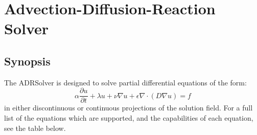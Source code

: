 \chapter{Advection-Diffusion-Reaction Solver}


\section{Synopsis}

The ADRSolver is designed to solve partial differential equations of the form:
\begin{equation}
\alpha \dfrac{\partial u}{\partial t} + \lambda u + \nu \nabla u + \epsilon \nabla \cdot (D \nabla u) = f
\end{equation}
in either discontinuous or continuous projections of the solution field. 
For a full list of the equations which are supported, and the capabilities of each equation, 
see the table below.


